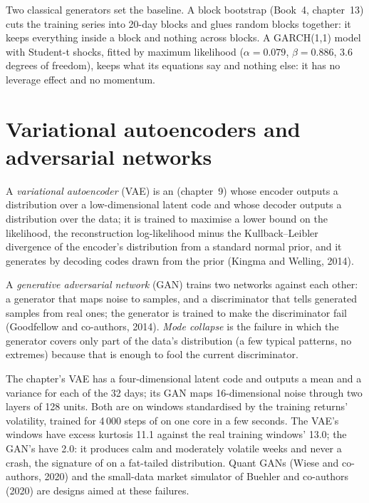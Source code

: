 Two classical generators set the baseline. A block bootstrap (Book~4, chapter~13) cuts the training series into 20-day
blocks and glues random blocks together: it keeps everything inside a block and nothing across blocks. A GARCH(1,1) model
with Student-t shocks, fitted by maximum likelihood ($\alpha = 0.079$, $\beta = 0.886$, 3.6 degrees of freedom), keeps
what its equations say and nothing else: it has no leverage effect and no momentum.

\section{Variational autoencoders and adversarial networks}

\begin{definition}\label{def:ml:generative-models-and-synthetic-data:vae}
A \emph{variational autoencoder} (VAE) is an  (chapter~9) whose encoder outputs a
distribution over a low-dimensional latent code and whose decoder outputs a distribution over the data; it is trained to
maximise a lower bound on the likelihood, the reconstruction log-likelihood minus the Kullback--Leibler divergence of the
encoder's distribution from a standard normal prior, and it generates by decoding codes drawn from the prior (Kingma and
Welling, 2014).
\end{definition}

\begin{definition}\label{def:ml:generative-models-and-synthetic-data:gan}
A \emph{generative adversarial network} (GAN) trains two networks against each other:
a generator that maps noise to samples, and a discriminator that tells generated samples from real ones; the generator is
trained to make the discriminator fail (Goodfellow and co-authors, 2014). \emph{Mode collapse} is the
failure in which the generator covers only part of the data's distribution (a few typical patterns, no extremes) because
that is enough to fool the current discriminator.
\end{definition}

The chapter's VAE has a four-dimensional latent code and outputs a mean and a variance for each of the 32 days; its GAN
maps 16-dimensional noise through two layers of 128 units. Both are  on windows standardised by the
training returns' volatility, trained for 4\,000 steps of  on one core in a few seconds. The VAE's windows have excess
kurtosis 11.1 against the real training windows' 13.0; the GAN's have 2.0: it produces calm and moderately volatile weeks
and never a crash, the signature of  on a fat-tailed distribution. Quant GANs (Wiese and co-authors, 2020) and
the small-data market simulator of Buehler and co-authors (2020) are designs aimed at these failures.

